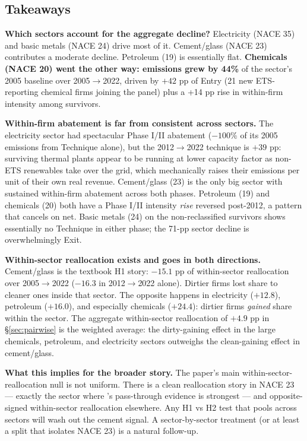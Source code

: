 \documentclass[11pt]{article}
\begin{document}
\subsection{Takeaways}

\textbf{Which sectors account for the aggregate decline?} Electricity (NACE 35) and basic metals (NACE 24) drive most of it. Cement/glass (NACE 23) contributes a moderate decline. Petroleum (19) is essentially flat. \textbf{Chemicals (NACE 20) went the other way: emissions grew by 44\%} of the sector's 2005 baseline over 2005$\to$2022, driven by $+42$ pp of Entry (21 new ETS-reporting chemical firms joining the panel) plus a +14 pp rise in within-firm intensity among survivors.

\textbf{Within-firm abatement is far from consistent across sectors.} The electricity sector had spectacular Phase I/II abatement ($-100$\% of its 2005 emissions from Technique alone), but the 2012$\to$2022 technique is $+39$ pp: surviving thermal plants appear to be running at lower capacity factor as non-ETS renewables take over the grid, which mechanically raises their emissions per unit of their own real revenue. Cement/glass (23) is the only big sector with sustained within-firm abatement across both phases. Petroleum (19) and chemicals (20) both have a Phase I/II intensity \emph{rise} reversed post-2012, a pattern that cancels on net. Basic metals (24) on the non-reclassified survivors shows essentially no Technique in either phase; the 71-pp sector decline is overwhelmingly Exit.

\textbf{Within-sector reallocation exists and goes in both directions.} Cement/glass is the textbook H1 story: $-15.1$ pp of within-sector reallocation over 2005$\to$2022 ($-16.3$ in 2012$\to$2022 alone). Dirtier firms lost share to cleaner ones inside that sector. The opposite happens in electricity ($+12.8$), petroleum ($+16.0$), and especially chemicals ($+24.4$): dirtier firms \emph{gained} share within the sector. The aggregate within-sector reallocation of $+4.9$ pp in \S\ref{sec:pairwise} is the weighted average: the dirty-gaining effect in the large chemicals, petroleum, and electricity sectors outweighs the clean-gaining effect in cement/glass.

\textbf{What this implies for the broader story.} The paper's main within-sector-reallocation null is not uniform. There is a clean reallocation story in NACE 23 --- exactly the sector where \cite{phase3}'s pass-through evidence is strongest --- and opposite-signed within-sector reallocation elsewhere. Any H1 vs H2 test that pools across sectors will wash out the cement signal. A sector-by-sector treatment (or at least a split that isolates NACE 23) is a natural follow-up.
\end{document}
